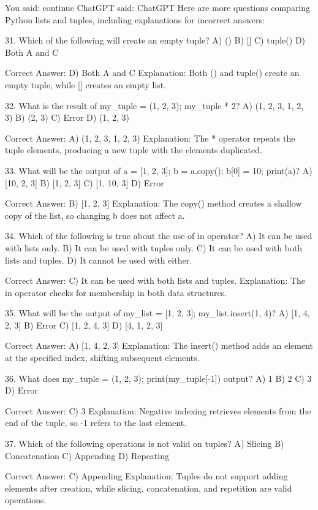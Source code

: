 You said:
continue
ChatGPT said:
ChatGPT
Here are more questions comparing Python lists and tuples, including explanations for incorrect answers:

31. Which of the following will create an empty tuple?
A) ()
B) []
C) tuple()
D) Both A and C

Correct Answer: D) Both A and C
Explanation: Both () and tuple() create an empty tuple, while [] creates an empty list.

32. What is the result of my_tuple = (1, 2, 3); my_tuple * 2?
A) (1, 2, 3, 1, 2, 3)
B) (2, 3)
C) Error
D) (1, 2, 3)

Correct Answer: A) (1, 2, 3, 1, 2, 3)
Explanation: The * operator repeats the tuple elements, producing a new tuple with the elements duplicated.

33. What will be the output of a = [1, 2, 3]; b = a.copy(); b[0] = 10; print(a)?
A) [10, 2, 3]
B) [1, 2, 3]
C) [1, 10, 3]
D) Error

Correct Answer: B) [1, 2, 3]
Explanation: The copy() method creates a shallow copy of the list, so changing b does not affect a.

34. Which of the following is true about the use of in operator?
A) It can be used with lists only.
B) It can be used with tuples only.
C) It can be used with both lists and tuples.
D) It cannot be used with either.

Correct Answer: C) It can be used with both lists and tuples.
Explanation: The in operator checks for membership in both data structures.

35. What will be the output of my_list = [1, 2, 3]; my_list.insert(1, 4)?
A) [1, 4, 2, 3]
B) Error
C) [1, 2, 4, 3]
D) [4, 1, 2, 3]

Correct Answer: A) [1, 4, 2, 3]
Explanation: The insert() method adds an element at the specified index, shifting subsequent elements.

36. What does my_tuple = (1, 2, 3); print(my_tuple[-1]) output?
A) 1
B) 2
C) 3
D) Error

Correct Answer: C) 3
Explanation: Negative indexing retrieves elements from the end of the tuple, so -1 refers to the last element.

37. Which of the following operations is not valid on tuples?
A) Slicing
B) Concatenation
C) Appending
D) Repeating

Correct Answer: C) Appending
Explanation: Tuples do not support adding elements after creation, while slicing, concatenation, and repetition are valid operations.

